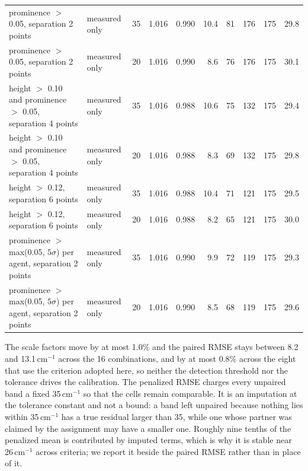 \documentclass[11pt]{article}
\newcommand*\wn{\ensuremath{\text{cm}^{-1}}}
\begin{document}
\begin{table}[htbp]
{\begin{tabular}{llrrrrrrrr}
prominence $>$ 0.05, separation 2 points & measured only & 35 & 1.016 & 0.990 & 10.4 & 81 & 176 & 175 & 29.8 \\
prominence $>$ 0.05, separation 2 points & measured only & 20 & 1.016 & 0.990 & 8.6 & 76 & 176 & 175 & 30.1 \\
height $>$ 0.10 and prominence $>$ 0.05, separation 4 points & measured only & 35 & 1.016 & 0.988 & 10.6 & 75 & 132 & 175 & 29.4 \\
height $>$ 0.10 and prominence $>$ 0.05, separation 4 points & measured only & 20 & 1.016 & 0.988 & 8.3 & 69 & 132 & 175 & 29.8 \\
height $>$ 0.12, separation 6 points & measured only & 35 & 1.016 & 0.988 & 10.4 & 71 & 121 & 175 & 29.5 \\
height $>$ 0.12, separation 6 points & measured only & 20 & 1.016 & 0.988 & 8.2 & 65 & 121 & 175 & 30.0 \\
prominence $>$ max(0.05, $5\sigma$) per agent, separation 2 points & measured only & 35 & 1.016 & 0.990 & 9.9 & 72 & 119 & 175 & 29.3 \\
prominence $>$ max(0.05, $5\sigma$) per agent, separation 2 points & measured only & 20 & 1.016 & 0.990 & 8.5 & 68 & 119 & 175 & 29.6 \\
\bottomrule
\end{tabular}
}

\begin{flushleft}\footnotesize The scale factors move by at most 1.0\% and the paired RMSE stays between 8.2 and 13.1\,\wn{} across the 16 combinations, and by at most 0.8\% across the eight that use the criterion adopted here, so neither the detection threshold nor the tolerance drives the calibration. The penalized RMSE charges every unpaired band a fixed 35\,\wn{} so that the cells remain comparable. It is an imputation at the tolerance constant and not a bound: a band left unpaired because nothing lies within 35\,\wn{} has a true residual larger than 35, while one whose partner was claimed by the assignment may have a smaller one. Roughly nine tenths of the penalized mean is contributed by imputed terms, which is why it is stable near 26\,\wn{} across criteria; we report it beside the paired RMSE rather than in place of it.\end{flushleft}
\end{table}
\end{document}
